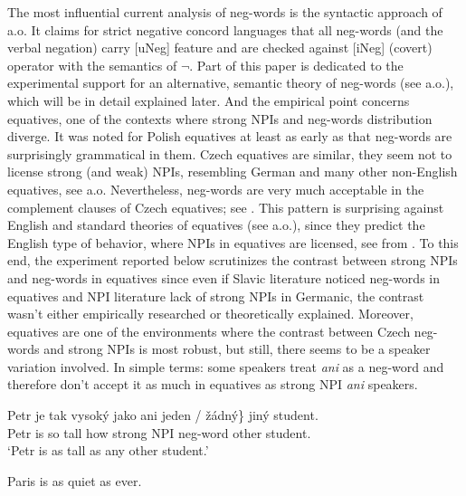 \noindent The most influential current analysis of neg-words is the syntactic approach of \cite{zeijlstra2004sentential} a.o. It claims for strict negative concord languages that all neg-words (and the verbal negation) carry [uNeg] feature and are checked against [iNeg] (covert) operator with the semantics of $\neg$. Part of this paper is dedicated to the experimental support for an alternative, semantic theory of neg-words (see \citealt{ovalle2004double,kuhn2022dynamics} a.o.), which will be in detail explained later. And the empirical point concerns equatives, one of the contexts where strong NPIs and neg-words distribution diverge. It was noted for Polish equatives at least as early as \citet{Blasczak:2001} that neg-words are surprisingly grammatical in them. Czech equatives are similar, they seem not to license strong (and weak) NPIs, resembling German and many other non-English equatives, see \citet{krifka1992some} a.o. Nevertheless,  neg-words are very much acceptable in the complement clauses of Czech equatives; see . This pattern is surprising against English and standard theories of equatives (see \cite{stechow1984comparing,beck201913} a.o.), since they predict the English type of behavior, where NPIs in equatives are licensed, see  from \citet{seuren1984comparative}. To this end, the experiment reported below scrutinizes the contrast between strong NPIs and neg-words in equatives since even if Slavic literature noticed neg-words in equatives and NPI literature lack of strong NPIs in Germanic, the contrast wasn't either empirically researched or theoretically explained. Moreover, equatives are one of the environments where the contrast between Czech neg-words and strong NPIs is most robust, but still, there seems to be a speaker variation involved. In simple terms: some speakers treat \emph{ani} as a neg-word and therefore don't accept it as much in equatives as strong NPI \textit{ani} speakers.
  
\ea\label{ex-4} \gll Petr je tak vysoký jako \minsp{\{} \minsp{\#} ani jeden / žádný\} jiný student.\\
Petr is so tall how {} {} strong NPI {} neg-word other student.\\
\glt `Petr is as tall as any other student.'
  
\ex\label{ex-5} Paris is as quiet as ever.
\z

